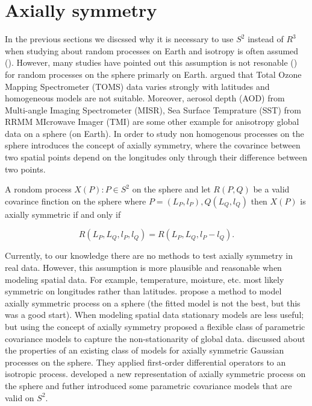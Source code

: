		
		\section{Axially symmetry}
			
		In the previous sections we discssed why it is necessary to use $S^2$ instead of $R^3$ when studying about random processes on Earth and isotropy is often assumed (\cite{Yadrenko1983, Yaglom1987}). However, many studies have pointed out this assumption is not resonable (\cite{Stein2007, JunStein2008, BolinLindgren2011}) for random processes on the sphere primarly on Earth. \cite{Stein2007} argued that Total Ozone Mapping Spectrometer (TOMS) data varies strongly with latitudes and homogeneous models are not suitable. Moreover, aerosol depth (AOD) from Multi-angle Imaging Spectrometer (MISR), Sea Surface Temprature (SST) from RRMM MIcrowave Imager (TMI) are some other example for anisotropy global data on a sphere (on Earth). In order to study non homogenous processes on the sphere \cite{Jones1963} introduces the concept of axially symmetry, where the covarince between two spatial points depend on the longitudes only through their difference  between two points.
			
		A rondom process $X(P): P\in S^2$ on the sphere and let $R(P,Q)$ be a valid covarince finction on the sphere where $P=(L_P, l_P), Q(L_Q,l_Q)$ then $X(P)$ is axially symmetric if and only if
		
		\[
			R(L_P, L_Q, l_P, l_Q) = R(L_P, L_Q, l_P-l_Q).
		\]
		
		Currently, to our knowledge there are no methods to test axially symmetry in real data. However, this assumption is more plausible and reasonable when modeling spatial data. For example, temperature, moisture, etc. most likely symmetric on longitudes rather than latitudes. \cite{Stein2007} propose a method to model axially symmetric process on a sphere (the fitted model is not the best, but this was a good start). When modeling spatial data stationary models are less useful; but using the concept of axially symmetry \cite{JunStein2008} proposed a flexible class of parametric covariance models to capture the non-stationarity of global data. \cite{HitczenkoStein2012} discussed about the properties of an existing class of models for axially symmetric Gaussian processes on the sphere. They applied first-order differential operators to an isotropic process. \cite{Huang2012} developed a new representation of axially symmetric process on the sphere and futher introduced some parametric covariance models that are valid on $S^2$.  \\
		
